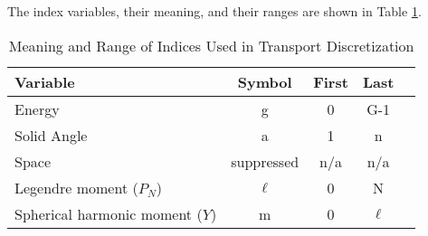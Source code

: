 \documentclass[12pt]{article}
\begin{document}
The index variables, their meaning, and their ranges are shown in Table \ref{table:index}. 
%
\begin{table}[!h]
\caption{Meaning and Range of Indices Used in Transport Discretization}
\begin{center}
\begin{tabular}{l c c c c}
\hline
Variable & Symbol & First & Last \\[0.5ex]
\hline
Energy & g & 0 & G-1 \\
Solid Angle & a & 1 & n \\
Space & suppressed & n/a & n/a \\
Legendre moment ($P_{N}$) & $\ell$ & 0 & N \\
Spherical harmonic moment ($Y$) & m & 0 & $\ell$ \\
\hline
\end{tabular}
\end{center}
\label{table:index}
\end{table}
%
\end{document}
